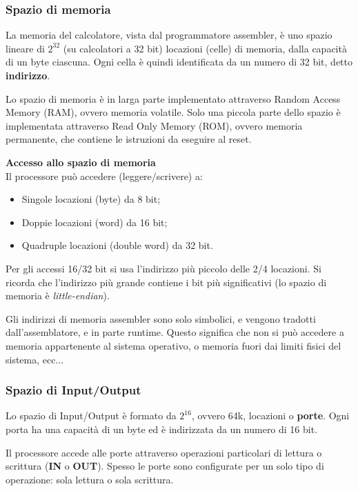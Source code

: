 \documentclass[a4paper,11pt]{article}
\begin{document}
\subsubsection{Spazio di memoria}
La memoria del calcolatore, vista dal programmatore assembler, è uno spazio lineare di $2^{32}$ (su calcolatori a 32 bit) locazioni (celle) di memoria, dalla capacità di un byte ciascuna.
Ogni cella è quindi identificata da un numero di 32 bit, detto \textbf{indirizzo}.

\par\smallskip

Lo spazio di memoria è in larga parte implementato attraverso Random Access Memory (RAM), ovvero memoria volatile.
Solo una piccola parte dello spazio è implementata attraverso Read Only Memory (ROM), ovvero memoria permanente, che contiene le istruzioni da eseguire al reset.

\par\medskip
\noindent
\textbf{\textsf{Accesso allo spazio di memoria}} \\
Il processore può accedere (leggere/scrivere) a:
\begin{itemize}
	\item Singole locazioni (byte) da 8 bit;
	\item Doppie locazioni (word) da 16 bit;
	\item Quadruple locazioni (double word) da 32 bit.
\end{itemize}

Per gli accessi 16/32 bit si usa l'indirizzo più piccolo delle 2/4 locazioni.
Si ricorda che l'indirizzo più grande contiene i bit più significativi (lo spazio di memoria è \textit{little-endian}).

Gli indirizzi di memoria assembler sono solo simbolici, e vengono tradotti dall'assemblatore, e in parte runtime.
Questo significa che non si può accedere a memoria appartenente al sistema operativo, o memoria fuori dai limiti fisici del sistema, ecc...

\subsubsection{Spazio di Input/Output}
Lo spazio di Input/Output è formato da $2^{16}$, ovvero 64k, locazioni o \textbf{porte}.
Ogni porta ha una capacità di un byte ed è indirizzata da un numero di 16 bit.

Il processore accede alle porte attraverso operazioni particolari di lettura o scrittura (\textsf{\textbf{IN}} o \textsf{\textbf{OUT}}).
Spesso le porte sono configurate per un solo tipo di operazione: sola lettura o sola scrittura.
\end{document}
